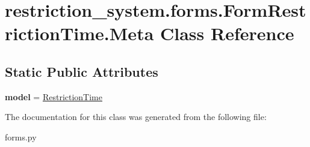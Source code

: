 \hypertarget{classrestriction__system_1_1forms_1_1FormRestrictionTime_1_1Meta}{}\section{restriction\+\_\+system.\+forms.\+Form\+Restriction\+Time.\+Meta Class Reference}
\label{classrestriction__system_1_1forms_1_1FormRestrictionTime_1_1Meta}
\subsection*{Static Public Attributes}
\begin{DoxyCompactItemize}
\item 
\hypertarget{classrestriction__system_1_1forms_1_1FormRestrictionTime_1_1Meta_aa465c44686be6bb9f0437ecc1a34e811}{}{\bfseries model} = \hyperlink{classrestriction__system_1_1models_1_1RestrictionTime}{Restriction\+Time}\label{classrestriction__system_1_1forms_1_1FormRestrictionTime_1_1Meta_aa465c44686be6bb9f0437ecc1a34e811}

\end{DoxyCompactItemize}


The documentation for this class was generated from the following file\+:\begin{DoxyCompactItemize}
\item 
forms.\+py\end{DoxyCompactItemize}
